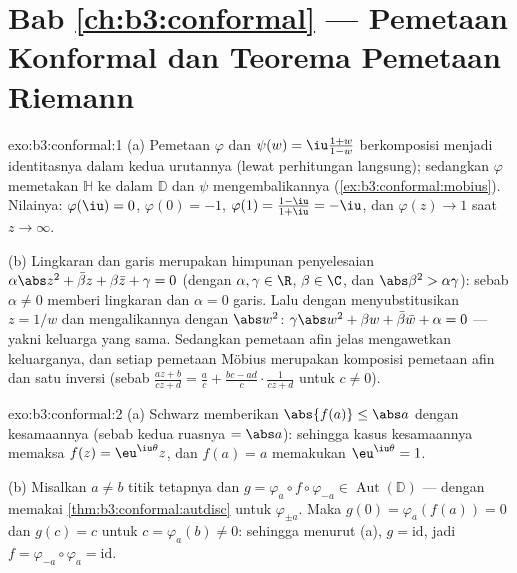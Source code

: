 \section*{Bab \ref{ch:b3:conformal} --- Pemetaan Konformal dan
Teorema Pemetaan Riemann}

\begin{solution}{exo:b3:conformal:1}
(a) Pemetaan $\varphi$ dan $\psi(w) = \iu\frac{1+w}{1-w}$ berkomposisi menjadi
identitasnya dalam kedua urutannya (lewat perhitungan langsung); sedangkan $\varphi$
memetakan $\mathbb H$ ke dalam $\mathbb D$ dan $\psi$ mengembalikannya
(\cref{ex:b3:conformal:mobius}). Nilainya: $\varphi(\iu) = 0$,
$\varphi(0) = -1$, $\varphi(1) = \frac{1 - \iu}{1 + \iu} =
-\iu$, dan $\varphi(z) \to 1$ saat $z \to \infty$.

(b) Lingkaran dan garis merupakan himpunan penyelesaian
$\alpha\abs z^2 + \bar\beta z + \beta\bar z + \gamma = 0$
(dengan $\alpha, \gamma \in \R$, $\beta \in \C$, dan $\abs\beta^2 >
\alpha\gamma$): sebab $\alpha \neq 0$ memberi lingkaran dan $\alpha = 0$ garis.
Lalu dengan menyubstitusikan $z = 1/w$ dan mengalikannya dengan $\abs w^2$:
$\gamma\abs w^2 + \beta w + \bar\beta\bar w + \alpha = 0$ ---
yakni keluarga yang sama. Sedangkan pemetaan afin jelas mengawetkan keluarganya, dan
setiap pemetaan Möbius merupakan komposisi pemetaan afin dan satu
inversi (sebab $\frac{az+b}{cz+d} = \frac ac + \frac{bc -
ad}{c}\cdot\frac1{cz + d}$ untuk $c \neq 0$).
\end{solution}

\begin{solution}{exo:b3:conformal:2}
(a) Schwarz memberikan $\abs{f(a)} \leq \abs a$ dengan kesamaannya (sebab kedua
ruasnya $= \abs a$): sehingga kasus kesamaannya memaksa $f(z) =
\eu^{\iu\theta}z$, dan $f(a) = a$ memakukan $\eu^{\iu\theta} = 1$.

(b) Misalkan $a \neq b$ titik tetapnya dan $g =
\varphi_a\circ f\circ\varphi_{-a} \in
\operatorname{Aut}(\mathbb D)$ --- dengan memakai
\cref{thm:b3:conformal:autdisc} untuk $\varphi_{\pm a}$. Maka
$g(0) = \varphi_a(f(a)) = 0$ dan $g(c) = c$ untuk $c =
\varphi_a(b) \neq 0$: sehingga menurut (a), $g = \mathrm{id}$, jadi $f =
\varphi_{-a}\circ\varphi_a = \mathrm{id}$.
\end{solution}

